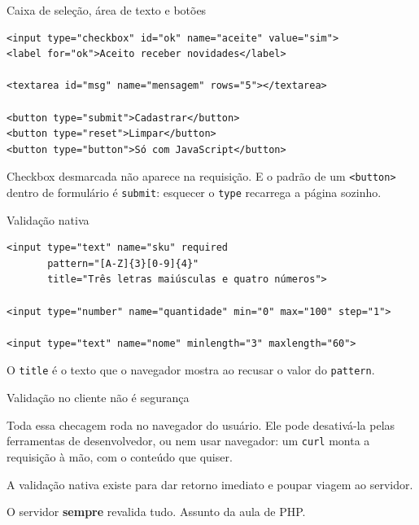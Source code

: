 \documentclass{beamer}
\begin{document}
\begin{frame}[fragile]{Caixa de seleção, área de texto e botões}
  \begin{verbatim}
<input type="checkbox" id="ok" name="aceite" value="sim">
<label for="ok">Aceito receber novidades</label>

<textarea id="msg" name="mensagem" rows="5"></textarea>

<button type="submit">Cadastrar</button>
<button type="reset">Limpar</button>
<button type="button">Só com JavaScript</button>
  \end{verbatim}

  \vspace{0.2cm}
  \small Checkbox desmarcada não aparece na requisição. E o padrão de um
  \texttt{<button>} dentro de formulário é \texttt{submit}: esquecer o
  \texttt{type} recarrega a página sozinho.
\end{frame}

\begin{frame}[fragile]{Validação nativa}
  \begin{verbatim}
<input type="text" name="sku" required
       pattern="[A-Z]{3}[0-9]{4}"
       title="Três letras maiúsculas e quatro números">

<input type="number" name="quantidade" min="0" max="100" step="1">

<input type="text" name="nome" minlength="3" maxlength="60">
  \end{verbatim}

  \vspace{0.2cm}
  \small O \texttt{title} é o texto que o navegador mostra ao recusar o valor do
  \texttt{pattern}.
\end{frame}

\begin{frame}{Validação no cliente não é segurança}
  \begin{alertblock}{}
    Toda essa checagem roda no navegador do usuário. Ele pode desativá-la pelas
    ferramentas de desenvolvedor, ou nem usar navegador: um \texttt{curl} monta a
    requisição à mão, com o conteúdo que quiser.
  \end{alertblock}

  \vspace{0.5cm}
  A validação nativa existe para dar retorno imediato e poupar viagem ao
  servidor.

  \vspace{0.3cm}
  O servidor \textbf{sempre} revalida tudo. Assunto da aula de PHP.
\end{frame}
\end{document}
